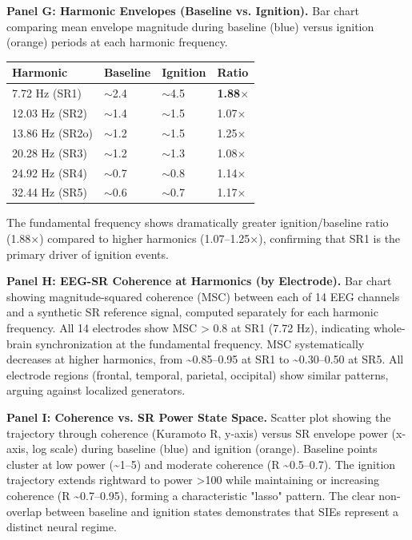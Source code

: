 \documentclass[11pt,a4paper]{article}
\begin{document}
\textbf{Panel G: Harmonic Envelopes (Baseline vs. Ignition).}
Bar chart comparing mean envelope magnitude during baseline (blue) versus ignition (orange) periods at each harmonic frequency.
\begin{table}[H]
    \centering
    \begin{tabular}{llll}
        \toprule
        Harmonic & Baseline & Ignition & Ratio \\
        \midrule
        7.72 Hz (SR1) & $\sim$2.4 & $\sim$4.5 & \textbf{1.88$\times$} \\
        12.03 Hz (SR2) & $\sim$1.4 & $\sim$1.5 & 1.07$\times$ \\
        13.86 Hz (SR2o) & $\sim$1.2 & $\sim$1.5 & 1.25$\times$ \\
        20.28 Hz (SR3) & $\sim$1.2 & $\sim$1.3 & 1.08$\times$ \\
        24.92 Hz (SR4) & $\sim$0.7 & $\sim$0.8 & 1.14$\times$ \\
        32.44 Hz (SR5) & $\sim$0.6 & $\sim$0.7 & 1.17$\times$ \\
        \bottomrule
    \end{tabular} \end{table}
The fundamental frequency shows dramatically greater ignition/baseline ratio (1.88×) compared to higher harmonics (1.07–1.25×), confirming that SR1 is the primary driver of ignition events.

\textbf{Panel H: EEG-SR Coherence at Harmonics (by Electrode).}
Bar chart showing magnitude-squared coherence (MSC) between each of 14 EEG channels and a synthetic SR reference signal, computed separately for each harmonic frequency. All 14 electrodes show MSC > 0.8 at SR1 (7.72 Hz), indicating whole-brain synchronization at the fundamental frequency. MSC systematically decreases at higher harmonics, from \textasciitilde{}0.85–0.95 at SR1 to \textasciitilde{}0.30–0.50 at SR5. All electrode regions (frontal, temporal, parietal, occipital) show similar patterns, arguing against localized generators.

\textbf{Panel I: Coherence vs. SR Power State Space.}
Scatter plot showing the trajectory through coherence (Kuramoto R, y-axis) versus SR envelope power (x-axis, log scale) during baseline (blue) and ignition (orange). Baseline points cluster at low power (\textasciitilde{}1–5) and moderate coherence (R \textasciitilde{}0.5–0.7). The ignition trajectory extends rightward to power >100 while maintaining or increasing coherence (R \textasciitilde{}0.7–0.95), forming a characteristic "lasso" pattern. The clear non-overlap between baseline and ignition states demonstrates that SIEs represent a distinct neural regime.
\end{document}
